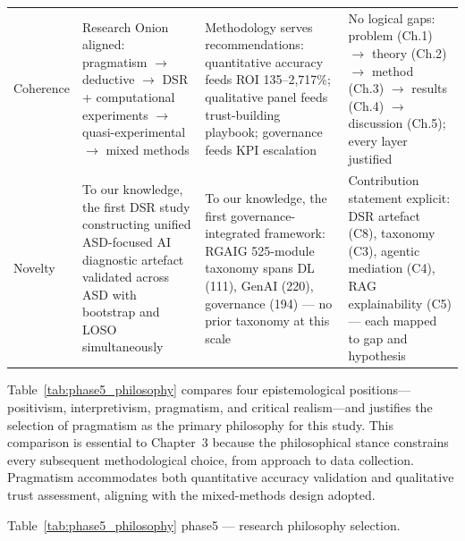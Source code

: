 \begin{xltabular}{\textwidth}{@{} p{0.10\textwidth} X X X @{}}
\addlinespace
Coherence           & Research Onion aligned: pragmatism $\rightarrow$ deductive $\rightarrow$ DSR + computational experiments $\rightarrow$ quasi-experimental $\rightarrow$ mixed methods & Methodology serves recommendations: quantitative accuracy feeds ROI 135--2{,}717\%; qualitative panel feeds trust-building playbook; governance feeds KPI escalation & No logical gaps: problem (Ch.1) $\rightarrow$ theory (Ch.2) $\rightarrow$ method (Ch.3) $\rightarrow$ results (Ch.4) $\rightarrow$ discussion (Ch.5); every layer justified \\
\addlinespace
Novelty             & To our knowledge, the first DSR study constructing unified ASD-focused AI diagnostic artefact validated across ASD with bootstrap and LOSO simultaneously & To our knowledge, the first governance-integrated framework: RGAIG 525-module taxonomy spans DL (111), GenAI (220), governance (194) --- no prior taxonomy at this scale & Contribution statement explicit: DSR artefact (C8), taxonomy (C3), agentic mediation (C4), RAG explainability (C5) --- each mapped to gap and hypothesis \\
\end{xltabular}
\endgroup

\vspace{1.5em}

Table~\ref{tab:phase5_philosophy} compares four epistemological positions---positivism, interpretivism, pragmatism, and critical realism---and justifies the selection of pragmatism as the primary philosophy for this study. This comparison is essential to Chapter~3 because the philosophical stance constrains every subsequent methodological choice, from approach to data collection. Pragmatism accommodates both quantitative accuracy validation and qualitative trust assessment, aligning with the mixed-methods design adopted.

\begingroup\singlespacing\tablefontsize\tablestripes
\noindent Table~\ref{tab:phase5_philosophy} phase5 --- research philosophy selection.


